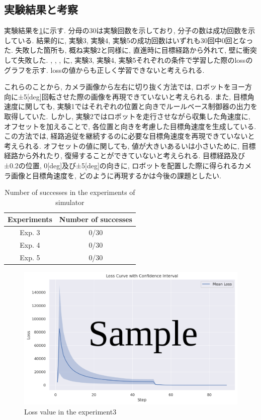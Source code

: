 \subsection{実験結果と考察}
実験結果を\ref{tb:inves}に示す. 分母の30は実験回数を示しており, 分子の数は成功回数を示している. 結果的に, 実験3, 実験4, 実験5の成功回数はいずれも30回中0回となった. 失敗した箇所も, 概ね実験2と同様に, 直進時に目標経路から外れて, 壁に衝突して失敗した. , , , に, 実験3, 実験4, 実験5それぞれの条件で学習した際のlossのグラフを示す. lossの値からも正しく学習できないと考えられる. 
\par これらのことから, カメラ画像から左右に切り抜く方法では, ロボットをヨー方向に±5[deg]回転させた際の画像を再現できていないと考えられる. また, 目標角速度に関しても, 実験1ではそれぞれの位置と向きでルールベース制御器の出力を取得していた. しかし, 実験2ではロボットを走行させながら収集した角速度に, オフセットを加えることで, 各位置と向きを考慮した目標角速度を生成している. この方法では, 経路追従を継続するのに必要な目標角速度を再現できていないと考えられる. オフセットの値に関しても, 値が大きいあるいは小さいために, 目標経路から外れたり, 復帰することができていないと考えられる. 目標経路及び±0.2の位置, 0[deg]及び±5[deg]の向きに, ロボットを配置した際に得られるカメラ画像と目標角速度を, どのように再現するかは今後の課題としたい. 

\begin{table}[h]
  \centering
  \caption{Number of successes in the experiments of simulator}
  \begin{tabular}{|c|c|} \hline
      Experiments & Number of successes \\ \hline
      Exp. 3 & 0/30 \\ \hline
      Exp. 4 & 0/30 \\ \hline
      Exp. 5 & 0/30 \\ \hline
    \end{tabular}
  \label{tb:inves}
\end{table}

\newpage
\begin{figure}[h]
  \centering
  \includegraphics[keepaspectratio, scale=0.6]{images/sample.png}
  \caption{Loss value in the experiment3}
  \label{Fig:sample3}
\end{figure}

